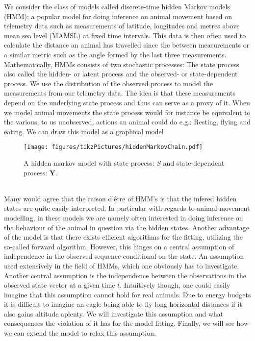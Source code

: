 We consider the class of models called discrete-time hidden Markov models (HMM); a popular model for doing inference on animal movement based on telemetry data such as measurements of latitude, longitudes and metres above mean sea level (MAMSL) at fixed time intervals. This data is then often used to calculate the distance an animal has travelled since the between measurements or a similar metric such as the angle formed by the last three measurements.\\ Mathematically, HMMs consists of two stochastic processes: The state process also called the hidden- or latent process and the observed- or state-dependent process. 
We use the distribution of the observed process to model the measurements from our telemetry data. The idea is that these measurements depend on the underlying state process and thus can serve as a proxy of it. When we model animal movements the state process would for instance be equivalent to the various, to us unobserved, actions an animal could do e.g.: Resting, flying and eating. We can draw this model as a graphical model
\begin{figure}[h]
    \centering
    \texttt{[image: figures/tikzPictures/hiddenMarkovChain.pdf]}
    \caption{A hidden markov model with state process: $S$ and state-dependent process: $\mathbf{Y}$.}
\end{figure}\\
Many would agree that the raison d'être of HMM's is that the infered hidden states are quite easily interpreted. In particular with regards to animal movement modelling, in these models we are namely often interested in doing inference on the behaviour of the animal in question via the hidden states. Another advantage of the model is that there exists efficient algorithms for the fitting, utilizing the so-called forward algorithm. However, this hinges on a central assumption of independence in the observed sequence conditional on the state. An assumption used extensively in the field of HMMs, which one obviously has to investigate. Another central assumption is the independence between the observations in the observed state vector at a given time $t$. Intuitively though, one could easily imagine that this assumption cannot hold for real animals. Due to energy budgets it is difficult to imagine an eagle being able to fly long horizontal distances if it also gains altitude aplenty. We will investigate this assumption and what consequences the violation of it has for the model fitting. Finally, we will see how we can extend the model to relax this assumption.
